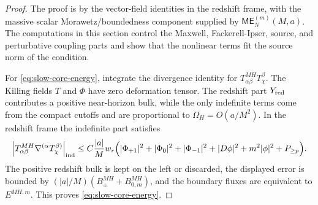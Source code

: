 \documentclass[11pt]{article}
\numberwithin{equation}{section}
\theoremstyle{plain}
\theoremstyle{definition}
\theoremstyle{remark}
\newcommand{\ME}{\mathsf{ME}}
\begin{document}
\begin{proof}
The proof is by the vector-field identities in the redshift frame, with the massive scalar Morawetz/boundedness component supplied by \(\ME^{(m)}_N(M,a)\).  The computations in this section control the Maxwell, Fackerell-Ipser, source, and perturbative coupling parts and show that the nonlinear terms fit the source norm of the condition.

For \eqref{eq:slow-core-energy}, integrate the divergence identity for \(T^{MH}_{\alpha\beta}T_\chi^\beta\).  The Killing fields \(T\) and \(\Phi\) have zero deformation tensor.  The redshift part \(Y_{\rm red}\) contributes a positive near-horizon bulk, while the only indefinite terms come from the compact cutoffs and are proportional to \(\Omega_H=O(a/M^2)\).  In the redshift frame the indefinite part satisfies
\begin{equation}
\left|T^{MH}_{\alpha\beta}\nabla^{(\alpha}T_\chi^{\beta)}\right|_{\rm ind}
\le
C\frac{|a|}{M}w_r
\Bigl(|\Phi_{+1}|^2+|\Phi_0|^2+|\Phi_{-1}|^2+|D\phi|^2+m^2|\phi|^2+P_{\ge p}\Bigr).
\end{equation}
The positive redshift bulk is kept on the left or discarded, the displayed error is bounded by \((|a|/M)(B_{\pm}^{MH}+B_{0,m}^{MH})\), and the boundary fluxes are equivalent to \(E^{MH,m}\).  This proves \eqref{eq:slow-core-energy}.


\end{proof}
\end{document}
